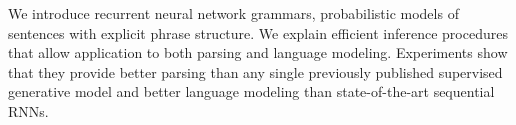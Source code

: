 We introduce recurrent neural network grammars, probabilistic models of sentences with explicit phrase structure.  We explain efficient inference procedures that allow application to both parsing and language modeling.  Experiments show that they provide better parsing than any single previously published  supervised generative model and better language modeling than state-of-the-art sequential RNNs.
